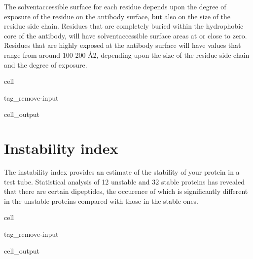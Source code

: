 \documentclass[letterpaper,10pt,english]{jupyterBook}
\begin{document}
\sphinxAtStartPar
The solvent\sphinxhyphen{}accessible surface for each residue depends upon the degree of exposure of the
residue on the antibody surface, but also on the size of the residue side chain. Residues that
are completely buried within the hydrophobic core of the antibody, will have solvent\sphinxhyphen{}accessible
surface areas at or close to zero. Residues that are highly exposed at the antibody surface will
have values that range from around 100 \sphinxhyphen{} 200 Å2, depending upon the size of the residue side
chain and the degree of exposure.

\begin{sphinxuseclass}{cell}
\begin{sphinxuseclass}{tag_remove-input}\begin{sphinxVerbatimOutput}

\begin{sphinxuseclass}{cell_output}
\noindent{}

\end{sphinxuseclass}\end{sphinxVerbatimOutput}

\end{sphinxuseclass}
\end{sphinxuseclass}

\section{Instability index}
\label{\detokenize{ipynb/chapter2:instability-index}}
\sphinxAtStartPar
The instability index provides an estimate of the stability of your protein in a test tube. Statistical analysis of 12 unstable and 32 stable proteins has revealed that there are certain dipeptides, the occurence of which is significantly different in the unstable proteins compared with those in the stable ones.

\begin{sphinxuseclass}{cell}
\begin{sphinxuseclass}{tag_remove-input}\begin{sphinxVerbatimOutput}

\begin{sphinxuseclass}{cell_output}
\noindent{}

\end{sphinxuseclass}\end{sphinxVerbatimOutput}

\end{sphinxuseclass}
\end{sphinxuseclass}
\end{document}
